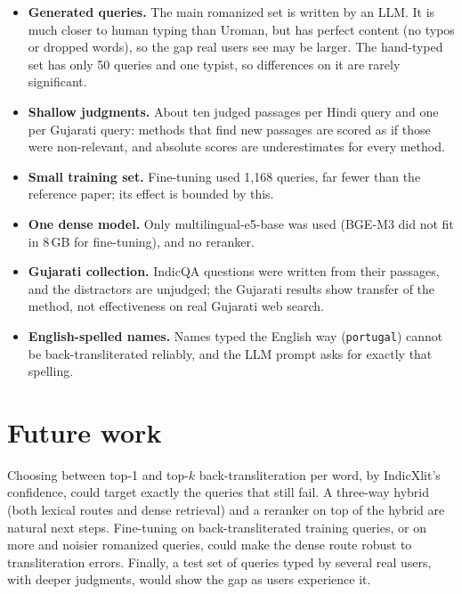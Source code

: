 \documentclass[11pt,a4paper]{article}
\newcommand{\rom}[1]{\texttt{#1}}          %
\begin{document}
\begin{itemize}
  \item \textbf{Generated queries.} The main romanized set is written by an LLM. It is much
        closer to human typing than Uroman, but has perfect content (no typos or dropped
        words), so the gap real users see may be larger. The hand-typed set has only 50
        queries and one typist, so differences on it are rarely significant.
  \item \textbf{Shallow judgments.} About ten judged passages per Hindi query and one per
        Gujarati query: methods that find new passages are scored as if those were
        non-relevant, and absolute scores are underestimates for every method.
  \item \textbf{Small training set.} Fine-tuning used 1,168 queries, far fewer than the
        reference paper; its effect is bounded by this.
  \item \textbf{One dense model.} Only multilingual-e5-base was used (BGE-M3 did not fit in
        8\,GB for fine-tuning), and no reranker.
  \item \textbf{Gujarati collection.} IndicQA questions were written from their passages,
        and the distractors are unjudged; the Gujarati results show transfer of the method,
        not effectiveness on real Gujarati web search.
  \item \textbf{English-spelled names.} Names typed the English way (\rom{portugal}) cannot be
        back-transliterated reliably, and the LLM prompt asks for exactly that spelling.
\end{itemize}

\section{Future work}

Choosing between top-1 and top-$k$ back-transliteration per word, by IndicXlit's confidence,
could target exactly the queries that still fail. A three-way hybrid (both lexical routes
and dense retrieval) and a reranker on top of the hybrid are natural next steps. Fine-tuning
on back-transliterated training queries, or on more and noisier romanized queries, could make
the dense route robust to transliteration errors. Finally, a test set of queries typed by
several real users, with deeper judgments, would show the gap as users experience it.

\end{document}
